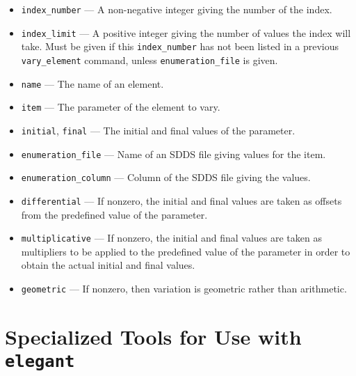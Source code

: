 \documentclass[11pt]{article}
\begin{document}
\begin{itemize}
\item \verb|index_number| --- A non-negative integer giving the number of the index.
\item \verb|index_limit| --- A positive integer giving the number of values the index will take.
 Must be given if this \verb|index_number| has not been listed in a previous \verb|vary_element|
command, unless \verb|enumeration_file| is given.
\item \verb|name| --- The name of an element.
\item \verb|item| --- The parameter of the element to vary.
\item \verb|initial|, \verb|final| --- The initial and final values of the parameter.
\item \verb|enumeration_file| --- Name of an SDDS file giving values for the item.
\item \verb|enumeration_column| --- Column of the SDDS file giving the values.
\item \verb|differential| --- If nonzero, the initial and final values are taken as
offsets from the predefined value of the parameter.
\item \verb|multiplicative| --- If nonzero, the initial and final values are taken as 
multipliers to be applied to the predefined value of the parameter in order to obtain
the actual initial and final values.
\item \verb|geometric| --- If nonzero, then variation is geometric rather than 
arithmetic.
\end{itemize}

\newpage
\section{Specialized Tools for Use with {\tt elegant}}
\end{document}
